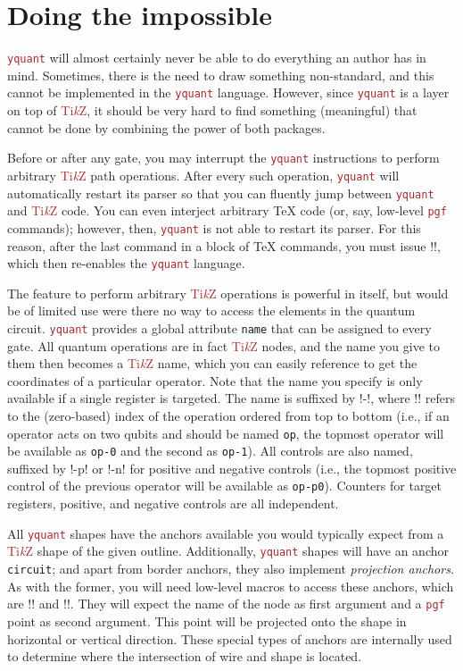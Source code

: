 \documentclass{scrartcl}
\def\TikZ{\textcolor{brown}{Ti\textit kZ}}
\def\pkg#1{\textcolor{brown}{\texttt{#1}}}
\def\Yquant{\pkg{yquant}}
\begin{document}
   \section{Doing the impossible}\label{sec:tikz}
      \Yquant{} will almost certainly never be able to do everything an author has in mind.
      Sometimes, there is the need to draw something non\hyp standard, and this cannot be implemented in the \Yquant{} language.
      However, since \Yquant{} is a layer on top of \TikZ, it should be very hard to find something (meaningful) that cannot be done by combining the power of both packages.
      
      Before or after any gate, you may interrupt the \Yquant{} instructions to perform arbitrary \TikZ{} path operations.
      After every such operation, \Yquant{} will automatically restart its parser so that you can fluently jump between \Yquant{} and \TikZ{} code.
      You can even interject arbitrary \TeX{} code (or, say, low\hyp level \pkg{pgf} commands); however, then, \Yquant{} is not able to restart its parser.
      For this reason, after the last command in a block of \TeX{} commands, you must issue \tex!\yquant!, which then re\hyp enables the \Yquant{} language.
      
      The feature to perform arbitrary \TikZ{} operations is powerful in itself, but would be of limited use were there no way to access the elements in the quantum circuit.
      \Yquant{} provides a global attribute \texttt{name} that can be assigned to every gate.
      All quantum operations are in fact \TikZ{} nodes, and the name you give to them then becomes a \TikZ{} name, which you can easily reference to get the coordinates of a particular operator.
      Note that the name you specify is only available if a single register is targeted.
      The name is suffixed by \tex!-\idx!, where \tex!\idx! refers to the (zero\hyp based) index of the operation ordered from top to bottom (i.e., if an operator acts on two qubits and should be named \texttt{op}, the topmost operator will be available as \texttt{op-0} and the second as \texttt{op-1}).
      All controls are also named, suffixed by \tex!-p\idx! or \tex!-n\idx! for positive and negative controls (i.e., the topmost positive control of the previous operator will be available as \texttt{op-p0}).
      Counters for target registers, positive, and negative controls are all independent.
      
      All \Yquant{} shapes have the anchors available you would typically expect from a \TikZ{} shape of the given outline.
      Additionally, \Yquant{} shapes will have an anchor \texttt{circuit}; and apart from border anchors, they also implement \emph{projection anchors}.
      As with the former, you will need low\hyp level macros to access these anchors, which are \tex!\pgfpointshapexproj! and \tex!\pgfpointshapeyproj!.
      They will expect the name of the node as first argument and a \pkg{pgf} point as second argument.
      This point will be projected onto the shape in horizontal or vertical direction.
      These special types of anchors are internally used to determine where the intersection of wire and shape is located.
      
\end{document}
